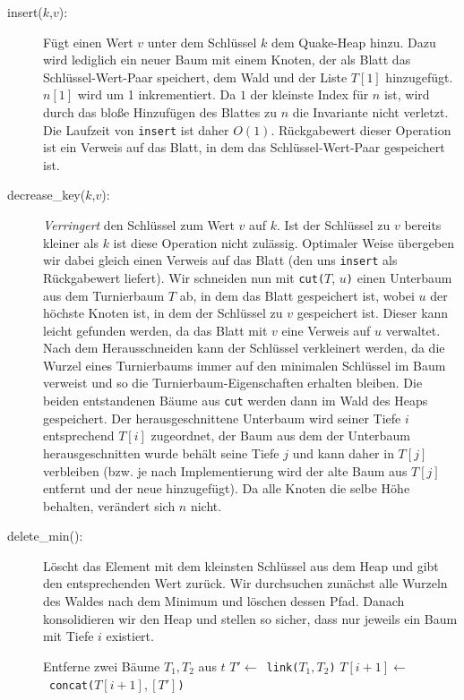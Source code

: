 \documentclass[a4paper,10pt]{article}
\begin{document}
\begin{description}
\item[insert($k$,$v$):]
    Fügt einen Wert $v$ unter dem Schlüssel $k$ dem Quake-Heap hinzu. 
    Dazu wird lediglich ein neuer Baum mit einem Knoten, der als Blatt das Schlüssel-Wert-Paar speichert, dem Wald und der Liste $T[1]$ hinzugefügt. 
    $n[1]$ wird um 1 inkrementiert. 
    Da $1$ der kleinste Index für $n$ ist, wird durch das bloße Hinzufügen des Blattes zu $n$ die Invariante nicht verletzt.
    Die Laufzeit von \verb!insert! ist daher $O(1)$. 
    Rückgabewert dieser Operation ist ein Verweis auf das Blatt, in dem das Schlüssel-Wert-Paar gespeichert ist.
\item[decrease\_key($k$,$v$):]
    \emph{Verringert} den Schlüssel zum Wert $v$ auf $k$. Ist der Schlüssel zu $v$ bereits kleiner als $k$ ist diese Operation nicht zulässig.
    Optimaler Weise übergeben wir dabei gleich einen Verweis auf das Blatt (den uns \verb!insert! als Rückgabewert liefert).
    Wir schneiden nun mit \verb!cut(!$T$, $u$\verb!)! einen Unterbaum aus dem Turnierbaum $T$ ab, in dem das Blatt gespeichert ist, wobei $u$ der höchste Knoten ist, in dem der Schlüssel zu $v$ gespeichert ist.
    Dieser kann leicht gefunden werden, da das Blatt mit $v$ eine Verweis auf $u$ verwaltet.
    Nach dem Herausschneiden kann der Schlüssel verkleinert werden, da die Wurzel eines Turnierbaums immer auf den minimalen Schlüssel im Baum verweist und so die Turnierbaum-Eigenschaften erhalten bleiben.
    Die beiden entstandenen Bäume aus \verb!cut! werden dann im Wald des Heaps gespeichert. 
    Der herausgeschnittene Unterbaum wird seiner Tiefe $i$ entsprechend $T[i]$ zugeordnet, der Baum aus dem der Unterbaum herausgeschnitten wurde behält seine Tiefe $j$ und kann daher in $T[j]$ verbleiben (bzw. je nach Implementierung wird der alte Baum aus $T[j]$ entfernt und der neue hinzugefügt). 
    Da alle Knoten die selbe Höhe behalten, verändert sich $n$ nicht. 
\item[delete\_min():]
    Löscht das Element mit dem kleinsten Schlüssel aus dem Heap und gibt den entsprechenden Wert zurück.
    Wir durchsuchen zunächst alle Wurzeln des Waldes nach dem Minimum und löschen dessen Pfad.
    Danach konsolidieren wir den Heap und stellen so sicher, dass nur jeweils ein Baum mit Tiefe $i$ existiert.
    \begin{algorithmic}
            \STATE Entferne zwei Bäume $T_1, T_2$ aus $t$
            \STATE $T' \gets$\ \verb!link(!$T_1, T_2$\verb!)!
            \STATE $T[i+1] \gets$\ \verb!concat(!$T[i+1], [T']$\verb!)!

\end{algorithmic}
\end{description}
\end{document}

